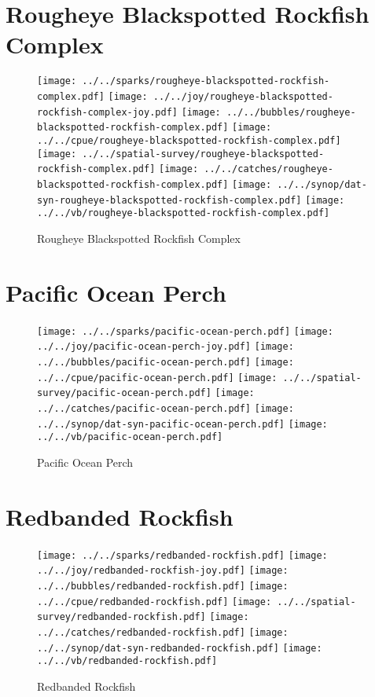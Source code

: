 \section{Rougheye Blackspotted Rockfish Complex}

\begin{figure}[htbp]
\centering
\texttt{[image: ../../sparks/rougheye-blackspotted-rockfish-complex.pdf]}
\texttt{[image: ../../joy/rougheye-blackspotted-rockfish-complex-joy.pdf]}
\texttt{[image: ../../bubbles/rougheye-blackspotted-rockfish-complex.pdf]}
\texttt{[image: ../../cpue/rougheye-blackspotted-rockfish-complex.pdf]}
\texttt{[image: ../../spatial-survey/rougheye-blackspotted-rockfish-complex.pdf]}
\texttt{[image: ../../catches/rougheye-blackspotted-rockfish-complex.pdf]}
\texttt{[image: ../../synop/dat-syn-rougheye-blackspotted-rockfish-complex.pdf]}
\texttt{[image: ../../vb/rougheye-blackspotted-rockfish-complex.pdf]}
\caption{Rougheye Blackspotted Rockfish Complex}
\end{figure}
\clearpage
\section{Pacific Ocean Perch}

\begin{figure}[htbp]
\centering
\texttt{[image: ../../sparks/pacific-ocean-perch.pdf]}
\texttt{[image: ../../joy/pacific-ocean-perch-joy.pdf]}
\texttt{[image: ../../bubbles/pacific-ocean-perch.pdf]}
\texttt{[image: ../../cpue/pacific-ocean-perch.pdf]}
\texttt{[image: ../../spatial-survey/pacific-ocean-perch.pdf]}
\texttt{[image: ../../catches/pacific-ocean-perch.pdf]}
\texttt{[image: ../../synop/dat-syn-pacific-ocean-perch.pdf]}
\texttt{[image: ../../vb/pacific-ocean-perch.pdf]}
\caption{Pacific Ocean Perch}
\end{figure}
\clearpage
\section{Redbanded Rockfish}

\begin{figure}[htbp]
\centering
\texttt{[image: ../../sparks/redbanded-rockfish.pdf]}
\texttt{[image: ../../joy/redbanded-rockfish-joy.pdf]}
\texttt{[image: ../../bubbles/redbanded-rockfish.pdf]}
\texttt{[image: ../../cpue/redbanded-rockfish.pdf]}
\texttt{[image: ../../spatial-survey/redbanded-rockfish.pdf]}
\texttt{[image: ../../catches/redbanded-rockfish.pdf]}
\texttt{[image: ../../synop/dat-syn-redbanded-rockfish.pdf]}
\texttt{[image: ../../vb/redbanded-rockfish.pdf]}
\caption{Redbanded Rockfish}
\end{figure}
\clearpage
